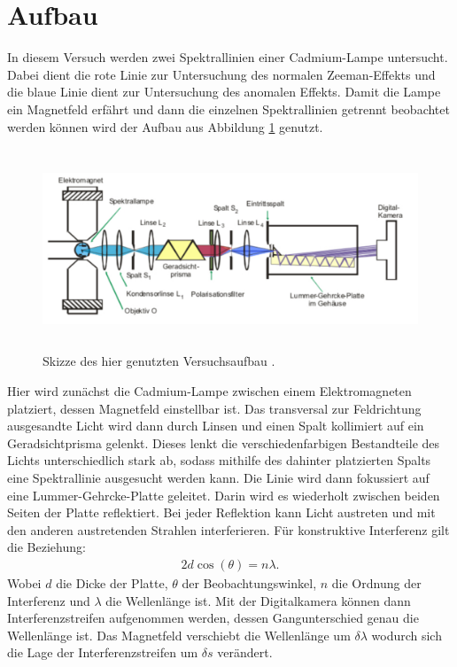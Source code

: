 \section{Aufbau}

In diesem Versuch werden zwei Spektrallinien einer Cadmium-Lampe untersucht. Dabei dient die rote Linie zur Untersuchung des normalen Zeeman-Effekts und die blaue Linie dient zur Untersuchung des anomalen Effekts. Damit die Lampe ein Magnetfeld erfährt und dann die einzelnen Spektrallinien getrennt beobachtet werden können wird der Aufbau aus Abbildung \ref{fig:aufbau} genutzt.
\begin{figure}
  \centering
  \includegraphics[height=6cm]{besuchInDerNacktmullAufzuchtstation/aufbau.pdf}
  \caption{Skizze des hier genutzten Versuchsaufbau \cite{anleitung}.}
  \label{fig:aufbau}
\end{figure}
Hier wird zunächst die Cadmium-Lampe zwischen einem Elektromagneten platziert, dessen Magnetfeld einstellbar ist. Das transversal zur Feldrichtung ausgesandte Licht wird dann durch Linsen und einen Spalt kollimiert auf ein Geradsichtprisma gelenkt. Dieses lenkt die verschiedenfarbigen Bestandteile des Lichts unterschiedlich stark ab, sodass mithilfe des dahinter platzierten Spalts eine Spektrallinie ausgesucht werden kann. Die Linie wird dann fokussiert auf eine Lummer-Gehrcke-Platte geleitet. Darin wird  es wiederholt zwischen beiden Seiten der Platte reflektiert. Bei jeder Reflektion kann Licht austreten und mit den anderen austretenden Strahlen interferieren. Für konstruktive Interferenz gilt
die Beziehung:
\begin{align}
  2 d \cos(\theta) = n \lambda.
\end{align}
Wobei $d$ die Dicke der Platte, $\theta$ der Beobachtungswinkel, $n$ die Ordnung der Interferenz und $\lambda$ die Wellenlänge ist. Mit der Digitalkamera können dann Interferenzstreifen aufgenommen werden, dessen Gangunterschied genau die Wellenlänge ist. Das Magnetfeld verschiebt die Wellenlänge um $\delta \lambda$ wodurch sich die Lage der Interferenzstreifen um $\delta s$ verändert.
